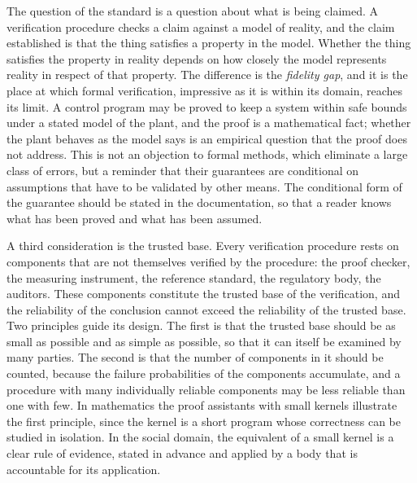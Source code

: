 The question of the standard is a question about what is being claimed. A verification procedure checks a claim against a model of reality, and the claim established is that the thing satisfies a property in the model. Whether the thing satisfies the property in reality depends on how closely the model represents reality in respect of that property. The difference is the \emph{fidelity gap}, and it is the place at which formal verification, impressive as it is within its domain, reaches its limit. A control program may be proved to keep a system within safe bounds under a stated model of the plant, and the proof is a mathematical fact; whether the plant behaves as the model says is an empirical question that the proof does not address. This is not an objection to formal methods, which eliminate a large class of errors, but a reminder that their guarantees are conditional on assumptions that have to be validated by other means. The conditional form of the guarantee should be stated in the documentation, so that a reader knows what has been proved and what has been assumed.

A third consideration is the trusted base. Every verification procedure rests on components that are not themselves verified by the procedure: the proof checker, the measuring instrument, the reference standard, the regulatory body, the auditors. These components constitute the trusted base of the verification, and the reliability of the conclusion cannot exceed the reliability of the trusted base. Two principles guide its design. The first is that the trusted base should be as small as possible and as simple as possible, so that it can itself be examined by many parties. The second is that the number of components in it should be counted, because the failure probabilities of the components accumulate, and a procedure with many individually reliable components may be less reliable than one with few. In mathematics the proof assistants with small kernels illustrate the first principle, since the kernel is a short program whose correctness can be studied in isolation. In the social domain, the equivalent of a small kernel is a clear rule of evidence, stated in advance and applied by a body that is accountable for its application.


